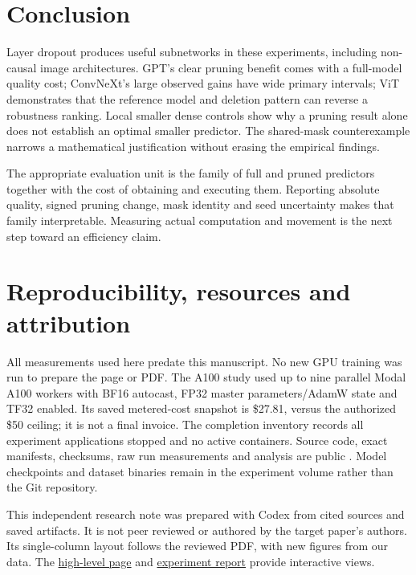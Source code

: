 \documentclass[10pt,letterpaper]{article}
\begin{document}
\section{Conclusion}
Layer dropout produces useful subnetworks in these experiments, including non-causal image architectures. GPT's clear pruning benefit comes with a full-model quality cost; ConvNeXt's large observed gains have wide primary intervals; ViT demonstrates that the reference model and deletion pattern can reverse a robustness ranking. Local smaller dense controls show why a pruning result alone does not establish an optimal smaller predictor. The shared-mask counterexample narrows a mathematical justification without erasing the empirical findings.

The appropriate evaluation unit is the family of full and pruned predictors together with the cost of obtaining and executing them. Reporting absolute quality, signed pruning change, mask identity and seed uncertainty makes that family interpretable. Measuring actual computation and movement is the next step toward an efficiency claim.

\section*{Reproducibility, resources and attribution}
All measurements used here predate this manuscript. No new GPU training was run to prepare the page or PDF. The A100 study used up to nine parallel Modal A100 workers with BF16 autocast, FP32 master parameters/AdamW state and TF32 enabled. Its saved metered-cost snapshot is \$27.81, versus the authorized \$50 ceiling; it is not a final invoice. The completion inventory records all experiment applications stopped and no active containers. Source code, exact manifests, checksums, raw run measurements and analysis are public \citep{repo}. Model checkpoints and dataset binaries remain in the experiment volume rather than the Git repository.

This independent research note was prepared with Codex from cited sources and saved artifacts. It is not peer reviewed or authored by the target paper's authors. Its single-column layout follows the reviewed PDF, with new figures from our data. The \href{https://yaroslavvb.github.io/gradient-dissent/significance/}{high-level page} and \href{https://yaroslavvb.github.io/gradient-dissent/a100-transfer/}{experiment report} provide interactive views.

\clearpage


\end{document}
